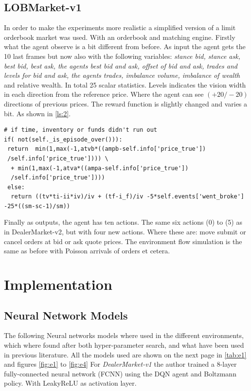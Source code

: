 \documentclass{kththesis}
\theoremstyle{definition}
\begin{document}
\subsection{LOBMarket-v1}
In order to make the experiments more realistic a simplified version of a limit orderbook market was used. With an orderbook and matching engine. Firstly what the agent observe is a bit different from before. As input the agent gets the 10 last frames but now also with the following variables: \textit{stance bid, stance ask, best bid, best ask, the agents best bid and ask, offset of bid and ask,  trades and levels for bid and ask, the agents trades, imbalance volume, imbalance of wealth} and relative wealth. 
\newline
\newline
In total 25 scalar statistics. Levels indicates the vision width in each direction from the reference price. Where the agent can see $(+20/-20)$ directions of previous prices. The reward function is slightly changed and varies a bit. As shown in \autoref{ls:2}.

\begin{lstlisting}[caption={Reward function for LOBMarket-v1},captionpos=b, label=ls:2]
# if time, inventory or funds didn't run out
if( not(self._is_episode_over())):
 return  min(1,max(-1,atvb*((ampb-self.info['price_true'])
 /self.info['price_true']))) \
  + min(1,max(-1,atva*((ampa-self.info['price_true'])
  /self.info['price_true']))) 
 else: 
  return ((tv*ti-ii*iv)/iv + (tf-i_f)/iv -5*self.events['went_broke'] -25*((sm-sc-1)/sm))
\end{lstlisting}
Finally as outputs, the agent has ten actions. The same six actions (0) to (5) as in DealerMarket-v2, but with four new actions. Where these are: move submit or cancel orders at bid or ask quote prices. The environment flow simulation is the same as before with Poisson arrivals of orders et cetera.

\newpage
\section{Implementation}


\subsection{Neural Network Models}
The following Neural networks models where used in the different environments, which where found after both hyper-parameter search, and what have been used in previous literature. All the models used are shown on the next page in \autoref{tab:e1} and figures \autoref{fig:e1} to \autoref{fig:e4} For \textit{DealerMarket-v1} the author trained a 8-layer fully-connected neural network (FCNN) using the DQN agent and Boltzmann policy. With LeakyReLU as activation layer.
\end{document}
